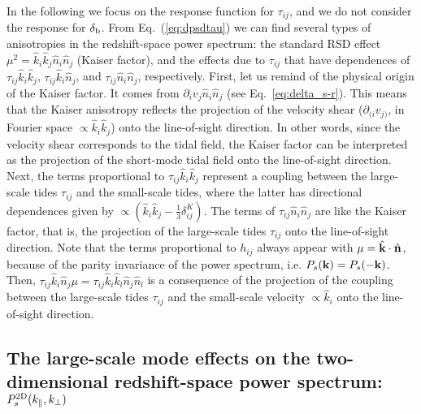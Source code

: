 \documentclass[prd,onecolumn,notitlepage,amsmath,amssymb,floatfix,superscriptaddress]{revtex4-1}
\newcommand{\bk}{{\bf k}}
\newcommand{\bn}{{\bf n}}
\newcommand{\hk}{\hat{k}}
\newcommand{\hn}{\hat{n}}
\newcommand{\br}{{\rm b}}
\begin{document}
In the following we focus on the response function for $\tau_{ij}$, and we do not consider the response for $\delta_\br$.
From Eq.~(\ref{eq:dpsdtau}) we can find several types of anisotropies in the redshift-space power spectrum:
the standard RSD effect $\mu^2=\hk_i\hk_j\hn_i\hn_j$ (Kaiser factor), and the effects due to $\tau_{ij}$ that have dependences of
$\tau_{ij}\hk_i\hk_j$, $\tau_{ij}\hk_i\hn_j$, and $\tau_{ij}\hn_i\hn_j$, respectively.
First, let us remind of the physical origin of the Kaiser factor.
It
comes from $\partial_i v_j \hn_i \hn_j$ (see Eq.~\ref{eq:delta_s-r}).
This means that the Kaiser anisotropy reflects the projection of the velocity shear ($\partial_{(i} v_{j)}$, in Fourier space $\propto \hk_i\hk_j$)
onto the line-of-sight direction.
In other words, since the velocity shear corresponds to the tidal field,
the Kaiser factor can be interpreted as the projection of the short-mode tidal field onto the line-of-sight direction.
Next, the terms proportional to $\tau_{ij}\hk_i\hk_j$ represent a coupling between the
large-scale tides $\tau_{ij}$ and the small-scale tides, where the latter has directional dependences given by
 $\propto \left( \hk_i \hk_j -\frac{1}{3}\delta_{ij}^K \right)$. The terms of
$\tau_{ij} \hn_i\hn_j$ are like the Kaiser factor, that is, the projection of the large-scale tides $\tau_{ij}$
onto the line-of-sight direction.
Note that the terms proportional to $h_{ij}$ always appear with $\mu = \hat{\bk} \cdot \hat{\bn}$,
because of the parity invariance of the power spectrum, i.e. $P_s(\bk)=P_s(-\bk)$.
Then, $\tau_{ij} \hk_i \hn_j \mu = \tau_{ij} \hk_i \hk_l \hn_j \hn_l$ is a consequence of the projection of the coupling between 
the large-scale tides $\tau_{ij}$ and the  small-scale velocity $\propto \hk_i$ onto the line-of-sight direction.


\subsection{\texorpdfstring{The large-scale mode effects on the two-dimensional redshift-space power spectrum:
$P^{\rm 2D}_s(k_\parallel,k_\perp)$}{The large-scale mode effects on the two-dimensional redshift-space power spectrum}  }
\end{document}
